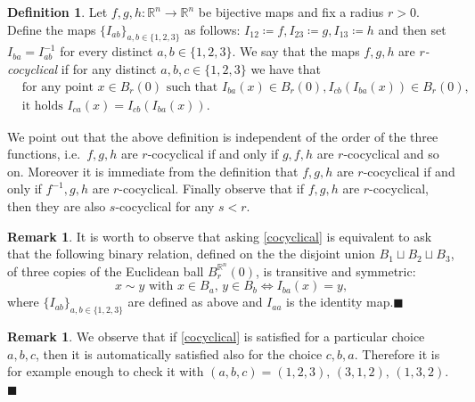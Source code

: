 \documentclass[11pt]{article}
\newcommand{\rr}{\mathbb{R}}
\newcommand{\fr}{\penalty-20\null\hfill$\blacksquare$}
\theoremstyle{plain}
\theoremstyle{definition}
\newtheorem{definition}[theorem]{Definition}
\newtheorem{remark}[theorem]{Remark}
\numberwithin{equation}{section}
\begin{document}
\begin{definition}\label{def:cocyclical}
	Let $f,g,h  : \rr^n \to \rr^n$ be bijective maps and fix a radius $r>0.$ Define  the maps $\{I_{ab}\}_{a,b \in \{1,2,3\}}$ as follows: $I_{12}\coloneqq f,I_{23}\coloneqq g,I_{13}\coloneqq h$  and then set $I_{ba}=I_{ab}^{-1}$ for every distinct $a,b \in \{1,2,3\}$. We say that the maps $f,g,h$ are \textit{$r$-cocyclical} if  for any distinct $a,b,c\in \{1,2,3\}$ we have that
	\begin{equation}\label{cocyclical}
		\begin{split}
			&\text{for any point } x \in B_r(0) \text{ such that } I_{ba}(x)\in B_r(0), I_{cb}(I_{ba}(x)) \in B_r(0), \\
			&\text{it holds } I_{ca}(x)=I_{cb}(I_{ba}(x)). 
		\end{split}	
	\end{equation}
\end{definition}
We point out  that the above definition is  independent of the order of the three functions, i.e.\ $f,g,h$ are $r$-cocyclical if and only if $g,f,h$ are $r$-cocyclical and so on.  Moreover it is immediate from the definition that $f,g,h$ are $r$-cocyclical if and only if $f^{-1},g,h$ are $r$-cocyclical. Finally observe that if $f,g,h$ are $r$-cocyclical, then they are also $s$-cocyclical for any $s<r.$
\begin{remark}\label{equivdef}
	It is worth to observe that asking \eqref{cocyclical}  is equivalent to ask that the following binary relation, defined on the the disjoint union  $B_1\sqcup B_2 \sqcup B_3$, of three copies of the Euclidean ball $B^{\rr^n}_r(0)$,  is transitive and symmetric:
	\[x \sim y \text{ with } x \in B_a, \,y \in B_b\Longleftrightarrow I_{ba}(x)=y ,\]
	where $\{I_{ab}\}_{a,b \in \{1,2,3\}}$ are defined as above and $I_{aa}$ is the identity map.\fr
\end{remark}
\begin{remark}\label{permutations}
	We observe that if \eqref{cocyclical} is satisfied for a particular choice $a,b,c$, then it is automatically satisfied also for the choice $c,b,a$.  Therefore it is for example  enough to check it with $(a,b,c)=(1,2,3),\,(3,1,2),\,(1,3,2).$ \fr
\end{remark}
\end{document}
